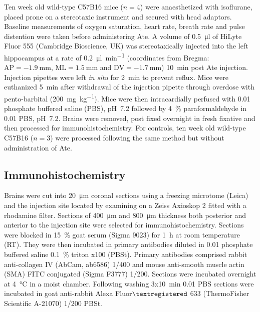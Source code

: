 \documentclass[a4paper,titlepage]{scrartcl}
\begin{document}
Ten week old wild-type C57B16 mice ($n = 4$) were anaesthetized with isoflurane, placed prone on a stereotaxic instrument and secured with head adaptors. Baseline measurements of oxygen saturation, heart rate, breath rate and pulse distention were taken before administering Ate. A volume of \SI{0.5}{\micro\litre} of \Abs HiLyte Fluor 555 (Cambridge Bioscience, UK) was stereotaxically injected into the left hippocampus at a rate of \SI{0.2}{\micro\litre\per\minute} (coordinates from Bregma: $\textrm{AP} = \SI{-1.9}{\milli\metre}$, $\textrm{ML} = \SI{1.5}{\milli\metre}$ and $\textrm{DV} = \SI{-1.7}{\milli\metre}$) \SI{10}{\minute} post Ate injection. Injection pipettes were left \textit{in situ} for \SI{2}{\minute} to prevent reflux. Mice were euthanized \SI{5}{\minute} after withdrawal of the injection pipette through overdose with pento-barbital (\SI{200}{\milli\gram\per\kilo\gram}). Mice were then intracardially perfused with \SI{0.01}{\Molar} phosphate buffered saline (PBS), pH~7.2 followed by \SI{4}{\percent} paraformaldehyde in \SI{0.01}{\Molar} PBS, pH~7.2. Brains were removed, post fixed overnight in fresh fixative and then processed for immunohistochemistry. For controls, ten week old wild-type C57B16 ($n = 3$) were processed following the same method but without administration of Ate.


\subsection{Immunohistochemistry}

Brains were cut into \SI{20}{\micro\metre} coronal sections using a freezing microtome (Leica) and the injection site located by examining on a Zeiss Axioskop 2 fitted with a rhodamine filter. Sections of \SI{400}{\micro\metre} and \SI{800}{\micro\metre} thickness both posterior and anterior to the injection site were selected for immunohistochemistry. Sections were blocked in \SI{15}{\percent} goat serum (Sigma 9023) for \SI{1}{\hour} at room temperature (RT). They were then incubated in primary antibodies diluted in \SI{0.01}{\Molar} phosphate buffered saline \SI{0.1}{\percent} triton x100 (PBSt). Primary antibodies comprised rabbit anti-collagen IV (AbCam, ab6586) 1/400 and mouse anti-smooth muscle actin (SMA) FITC conjugated (Sigma F3777) 1/200. Sections were incubated overnight at \SI{4}{\celsius} in a moist chamber. Following washing 3x\SI{10}{\minute} \SI{0.01}{\Molar} PBS sections were incubated in goat anti-rabbit Alexa Fluor$\textregistered$ 633 (ThermoFisher Scientific A-21070) 1/200 PBSt.
\end{document}
